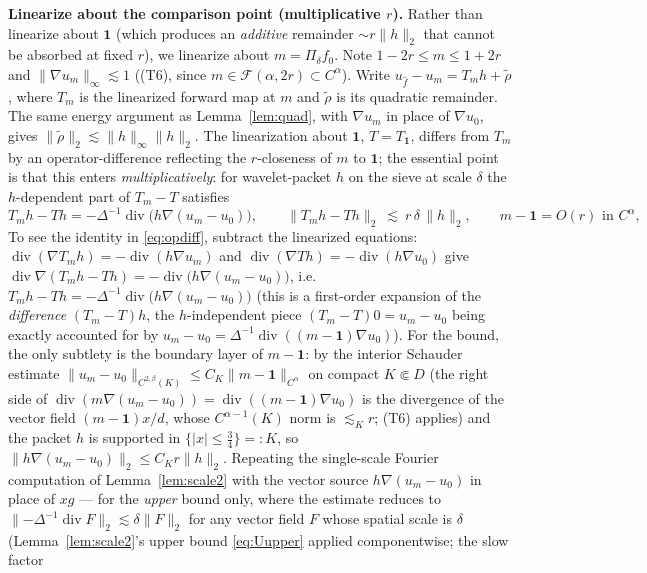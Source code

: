 \documentclass[11pt]{article}
\theoremstyle{remark}
\newcommand{\F}{\mathcal{F}}
\newcommand{\one}{\mathbf{1}}
\newcommand{\norm}[1]{\lVert #1\rVert}
\newcommand{\abs}[1]{\lvert #1\rvert}
\newcommand{\SET}[1]{\{#1\}}
\DeclareMathOperator{\diver}{div}
\begin{document}
\noindent\textbf{Linearize about the comparison point (multiplicative
$r$).} Rather than linearize about $\one$ (which produces an
\emph{additive} remainder $\sim r\norm{h}_2$ that cannot be absorbed at
fixed $r$), we linearize about $m=\Pi_\delta f_0$. Note
$1-2r\le m\le1+2r$ and $\norm{\nabla u_m}_{\infty}\lesssim1$ ((T6), since
$m\in\F(\alpha,2r)\subset C^\alpha$). Write
$u_{\widehat f}-u_{m}=T_{m}h+\widetilde\rho$, where $T_{m}$ is the
linearized forward map at $m$ and $\widetilde\rho$ is its quadratic
remainder. The same energy argument as Lemma~\ref{lem:quad}, with
$\nabla u_m$ in place of $\nabla u_0$, gives
$\norm{\widetilde\rho}_2\lesssim\norm{h}_\infty\norm{h}_2$. The
linearization about $\one$, $T=T_\one$, differs from $T_m$ by an
operator-difference reflecting the $r$-closeness of $m$ to $\one$; the
essential point is that this enters \emph{multiplicatively}: for
wavelet-packet $h$ on the sieve at scale $\delta$ the $h$-dependent part
of $T_m-T$ satisfies
\begin{equation}\label{eq:opdiff}
T_mh-Th=-\Delta^{-1}\diver\bigl(h\nabla(u_m-u_0)\bigr),
\qquad
\norm{T_mh-Th}_2\ \lesssim\ r\,\delta\,\norm{h}_2 ,
\qquad m-\one=O(r)\text{ in }C^\alpha,
\end{equation}
To see the identity in \eqref{eq:opdiff}, subtract the linearized
equations: $\diver(\nabla T_mh)=-\diver(h\nabla u_m)$ and
$\diver(\nabla Th)=-\diver(h\nabla u_0)$ give
$\diver\nabla(T_mh-Th)=-\diver\bigl(h\nabla(u_m-u_0)\bigr)$, i.e.\
$T_mh-Th=-\Delta^{-1}\diver\bigl(h\nabla(u_m-u_0)\bigr)$ (this is a
first-order expansion of the \emph{difference} $(T_m-T)h$, the
$h$-independent piece $(T_m-T)0=u_m-u_0$ being exactly accounted for by
$u_m-u_0=\Delta^{-1}\diver((m-\one)\nabla u_0)$).
For the bound, the only subtlety is the boundary layer of $m-\one$: by the
interior Schauder estimate
$\norm{u_m-u_0}_{C^{2,\beta}(K)}\le C_K\norm{m-\one}_{C^\alpha}$ on
compact $K\Subset D$ (the right side of
$\diver(m\nabla(u_m-u_0))=\diver((m-\one)\nabla u_0)$ is the divergence
of the vector field $(m-\one)x/d$, whose $C^{\alpha-1}(K)$ norm is
$\lesssim_K r$; (T6) applies) and the packet $h$ is supported in
$\SET{\abs x\le\tfrac34}=:K$, so
$\norm{h\nabla(u_m-u_0)}_2\le C_K r\norm h_2$.
Repeating the
single-scale Fourier computation of Lemma~\ref{lem:scale2} with the
vector source $h\nabla(u_m-u_0)$ in place of $xg$ --- for the
\emph{upper} bound only, where the estimate reduces to
$\norm{-\Delta^{-1}\diver F}_2\lesssim\delta\norm F_2$ for any vector
field $F$ whose spatial scale is $\delta$ (Lemma~\ref{lem:scale2}'s
upper bound \eqref{eq:Uupper} applied componentwise; the slow factor
\end{document}
